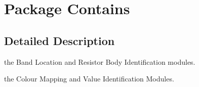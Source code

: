 \hypertarget{namespace_contains}{}\section{Package Contains}
\label{namespace_contains}


\subsection{Detailed Description}
the Band Location and Resistor Body Identification modules.

the Colour Mapping and Value Identification Modules. 